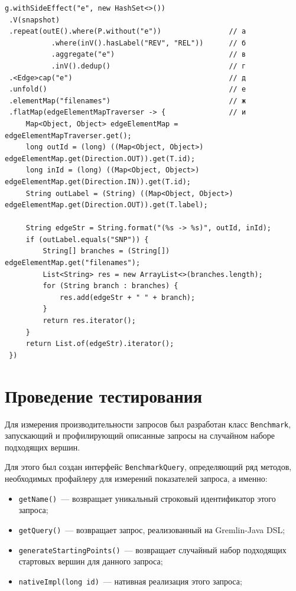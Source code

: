 \documentclass[times,specification,annotation]{itmo-student-thesis}
\begin{document}
\begin{lstlisting}[float=!h,caption={Дерево ревизий снимка на Gremlin},label={lst:snp}]
g.withSideEffect("e", new HashSet<>())
 .V(snapshot)
 .repeat(outE().where(P.without("e"))                // а
           .where(inV().hasLabel("REV", "REL"))      // б
           .aggregate("e")                           // в
           .inV().dedup()                            // г
 .<Edge>cap("e")                                     // д
 .unfold()                                           // е
 .elementMap("filenames")                            // ж
 .flatMap(edgeElementMapTraverser -> {               // и
     Map<Object, Object> edgeElementMap = edgeElementMapTraverser.get();
     long outId = (long) ((Map<Object, Object>) edgeElementMap.get(Direction.OUT)).get(T.id);
     long inId = (long) ((Map<Object, Object>) edgeElementMap.get(Direction.IN)).get(T.id);
     String outLabel = (String) ((Map<Object, Object>) edgeElementMap.get(Direction.OUT)).get(T.label);

     String edgeStr = String.format("(%s -> %s)", outId, inId);
     if (outLabel.equals("SNP")) {
         String[] branches = (String[]) edgeElementMap.get("filenames");
         List<String> res = new ArrayList<>(branches.length);
         for (String branch : branches) {
             res.add(edgeStr + " " + branch);
         }
         return res.iterator();
     }
     return List.of(edgeStr).iterator();
 })
\end{lstlisting}

\section{Проведение тестирования}

Для измерения производительности запросов был разработан класс \texttt{Benchmark}, запускающий и профилирующий описанные запросы на случайном наборе подходящих вершин. 

Для этого был создан интерфейс \texttt{BenchmarkQuery}, определяющий ряд методов, необходимых профайлеру для измерений показателей запроса, а именно:

\begin{itemize}
    \item \texttt{getName()}~--- возвращает уникальный строковый идентификатор этого запроса;
    \item \texttt{getQuery()}~--- возвращает запрос, реализованный на Gremlin-Java DSL;
    \item \texttt{generateStartingPoints()}~--- возвращает случайный набор подходящих стартовых вершин для данного запроса;
    \item \texttt{nativeImpl(long id)}~--- нативная реализация этого запроса;
\end{itemize}
\end{document}
